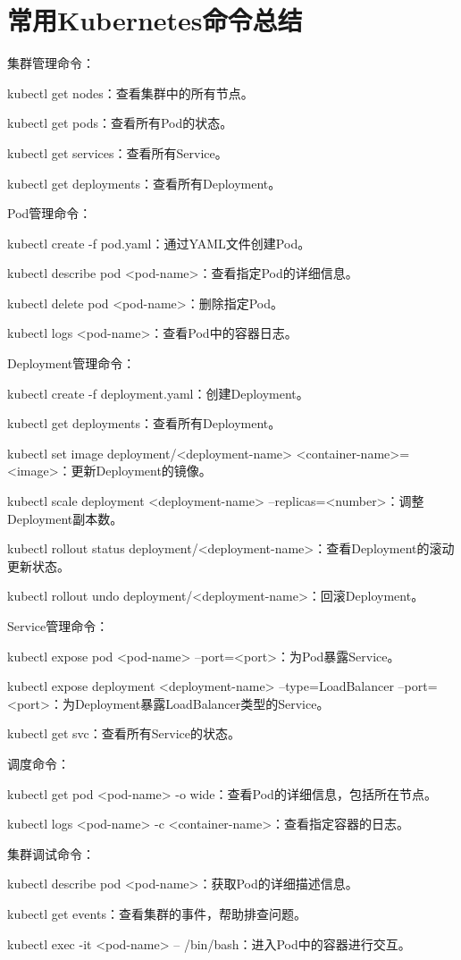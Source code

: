 \section{常用Kubernetes命令总结}
{\footnotesize %
集群管理命令：

kubectl get nodes：查看集群中的所有节点。

kubectl get pods：查看所有Pod的状态。

kubectl get services：查看所有Service。

kubectl get deployments：查看所有Deployment。

Pod管理命令：

kubectl create -f pod.yaml：通过YAML文件创建Pod。

kubectl describe pod <pod-name>：查看指定Pod的详细信息。

kubectl delete pod <pod-name>：删除指定Pod。

kubectl logs <pod-name>：查看Pod中的容器日志。

Deployment管理命令：

kubectl create -f deployment.yaml：创建Deployment。

kubectl get deployments：查看所有Deployment。

kubectl set image deployment/<deployment-name> <container-name>=<image>：更新Deployment的镜像。

kubectl scale deployment <deployment-name> --replicas=<number>：调整Deployment副本数。

kubectl rollout status deployment/<deployment-name>：查看Deployment的滚动更新状态。

kubectl rollout undo deployment/<deployment-name>：回滚Deployment。

Service管理命令：

kubectl expose pod <pod-name> --port=<port>：为Pod暴露Service。

kubectl expose deployment <deployment-name> --type=LoadBalancer --port=<port>：为Deployment暴露LoadBalancer类型的Service。

kubectl get svc：查看所有Service的状态。

调度命令：

kubectl get pod <pod-name> -o wide：查看Pod的详细信息，包括所在节点。

kubectl logs <pod-name> -c <container-name>：查看指定容器的日志。

集群调试命令：

kubectl describe pod <pod-name>：获取Pod的详细描述信息。

kubectl get events：查看集群的事件，帮助排查问题。

kubectl exec -it <pod-name> -- /bin/bash：进入Pod中的容器进行交互。
}
